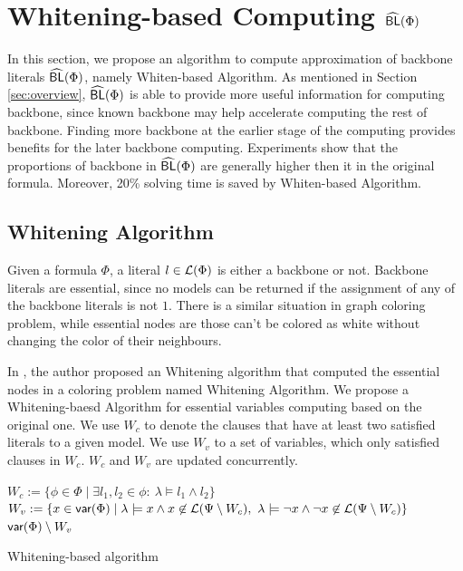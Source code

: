 \section{Whitening-based Computing ${\sf \widehat{BL}}(\Phi)$}

In this section, we propose an algorithm to compute approximation of backbone literals ${\sf \widehat{BL}}(\Phi)$, namely Whiten-based Algorithm. As mentioned in Section \ref{sec:overview}, ${\sf \widehat{BL}}(\Phi)$ is able to provide more useful information for computing backbone, since known backbone may help accelerate computing the rest of backbone. Finding more backbone at the earlier stage of the computing provides benefits for the later backbone computing. Experiments show that the proportions of backbone in ${\sf \widehat{BL}}(\Phi)$ are generally higher then it in the original formula. Moreover, 20\% solving time is saved by Whiten-based Algorithm.

\subsection{Whitening Algorithm}

Given a formula $\Phi$, a literal $l\in\Lit(\Phi)$ is either a backbone or not. Backbone literals are essential, since no models can be returned if the assignment of any of the backbone literals is not $1$. There is a similar situation in graph coloring problem, while essential nodes are those can't be colored as white without changing the color of their neighbours.

In \cite{Par03}, the author proposed an Whitening algorithm that computed the essential nodes in a coloring problem named Whitening Algorithm. We propose a Whitening-baesd Algorithm for essential variables computing based on the original one. We use $W_c$ to denote the clauses that have at least two satisfied literals to a given model. We use $W_v$ to a set of variables, which only satisfied clauses in $W_c$. $W_c$ and $W_v$ are updated concurrently.
\newpage
\begin{algorithm2e}
\SetAlgoShortEnd
\SetFillComment
{}
$W_c:= \{\phi\in\Phi \mid \exists l_1,l_2\in\phi: \  \lambda\models l_1\wedge l_2\}$\; \label{alg2:c}
$W_v:=\{x\in \var(\Phi)\mid \lambda\models x\wedge x\not\in \Lit(\Psi\setminus W_c),
        \ \lambda\models \neg x\wedge \neg x\not\in \Lit(\Psi\setminus W_c)\}$\; \label{alg2:v}
\Return $\textsf{var}(\Phi)\setminus W_v$\;
\caption{Whitening-based algorithm}
\label{alg:whitening}
\end{algorithm2e}

